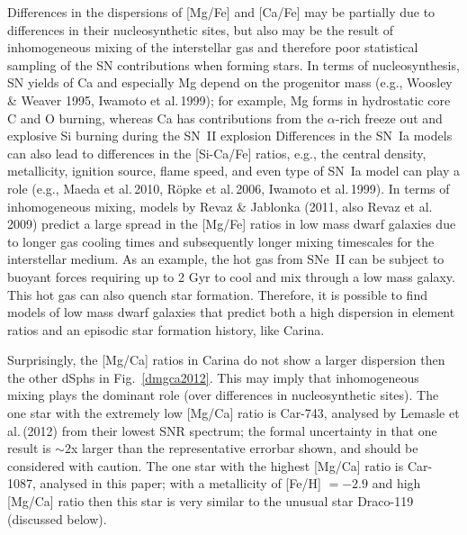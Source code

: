 \documentclass{emulateapj}
\newcommand\etal{{\rm et al.\,}}
\begin{document}
Differences in the dispersions of [Mg/Fe] and [Ca/Fe] may be partially due to 
differences in their nucleosynthetic sites, but also may be the result of 
inhomogeneous mixing of the interstellar gas and therefore poor statistical 
sampling of the SN contributions when forming stars.   In terms of nucleosynthesis, 
SN yields of Ca and especially Mg depend on the progenitor mass
(e.g., Woosley \& Weaver 1995, Iwamoto \etal 1999); for example,  
Mg forms in hydrostatic core C and O burning, 
whereas Ca has contributions from the $\alpha$-rich 
freeze out and explosive Si burning during the SN~II explosion
Differences in the SN~Ia models can also lead to differences 
in the [Si-Ca/Fe] ratios, e.g., the central density, 
metallicity, ignition source, flame speed, and even type of SN~Ia
model can play a role
(e.g., Maeda \etal 2010, R\"opke \etal  2006, Iwamoto \etal  1999).  
%
In terms of inhomogeneous mixing, models by Revaz \& Jablonka 
(2011, also Revaz \etal 2009) predict a large spread in the [Mg/Fe] 
ratios in low mass dwarf galaxies due to longer gas cooling times 
and subsequently longer mixing timescales for the interstellar medium.
As an example, the hot gas from SNe~II can be subject to buoyant forces 
requiring up to 2 Gyr to cool and mix through a low mass galaxy.   
This hot gas can also quench star formation.   Therefore, it is possible
to find models of low mass dwarf galaxies that predict both a high dispersion 
in element ratios and an episodic star formation history, like Carina.
 
Surprisingly, the [Mg/Ca] ratios in Carina
do not show a larger dispersion then the other dSphs in Fig.~\ref{dmgca2012}. 
This may imply that inhomogeneous mixing plays the dominant role 
(over differences in nucleosynthetic sites). 
The one star with the extremely low [Mg/Ca] ratio is Car-743, 
analysed by Lemasle \etal (2012) from their lowest SNR spectrum; 
the formal uncertainty in that one result is $\sim2$x larger
than the representative errorbar shown, and should be considered with caution.
The one star with the highest [Mg/Ca] ratio is Car-1087, 
analysed in this paper; with a metallicity of [Fe/H] $=-2.9$ and 
high [Mg/Ca] ratio then this star is very similar to the unusual 
star Draco-119 (discussed below).
\end{document}
